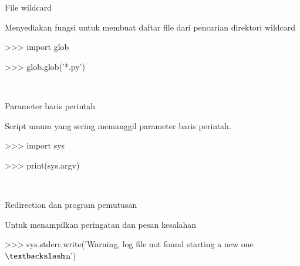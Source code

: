 \documentclass[a4paper,12pt]{report}
\begin{document}
\vspace{14pt}
\noindent 
{\fontsize{14pt}{14pt}\selectfont File wildcard \\} \par
\noindent 
{\fontsize{14pt}{14pt}\selectfont Menyediakan fungsi untuk membuat daftar file dari pencarian direktori wildcard \\} \par
\vspace{14pt}
\noindent 
{\fontsize{14pt}{14pt}\selectfont >>> import glob \\} \par
\vspace{14pt}
\noindent 
{\fontsize{14pt}{14pt}\selectfont >>> glob.glob('*.py') \\} \par
\noindent 
{\fontsize{14pt}{14pt} \\} \par
\vspace{14pt}
\noindent 
{\fontsize{14pt}{14pt}\selectfont Parameter baris perintah  \\} \par
\noindent 
{\fontsize{14pt}{14pt}\selectfont Script umum yang sering memanggil parameter baris perintah.  \\} \par
\vspace{14pt}
\noindent 
{\fontsize{14pt}{14pt}\selectfont >>> import sys \\} \par
\vspace{14pt}
\noindent 
{\fontsize{14pt}{14pt}\selectfont >>> print(sys.argv) \\} \par
\noindent 
{\fontsize{14pt}{14pt} \\} \par
\vspace{14pt}
\noindent 
{\fontsize{14pt}{14pt}\selectfont Redirection dan program pemutusan \\} \par
\noindent 
{\fontsize{14pt}{14pt}\selectfont Untuk menampilkan peringatan dan pesan kesalahan \\} \par
\vspace{14pt}
\noindent 
{\fontsize{14pt}{14pt}\selectfont >>> sys.stderr.write('Warning, log file not found starting a new one $  \textbackslash  $n') \\} \par
\end{document}
